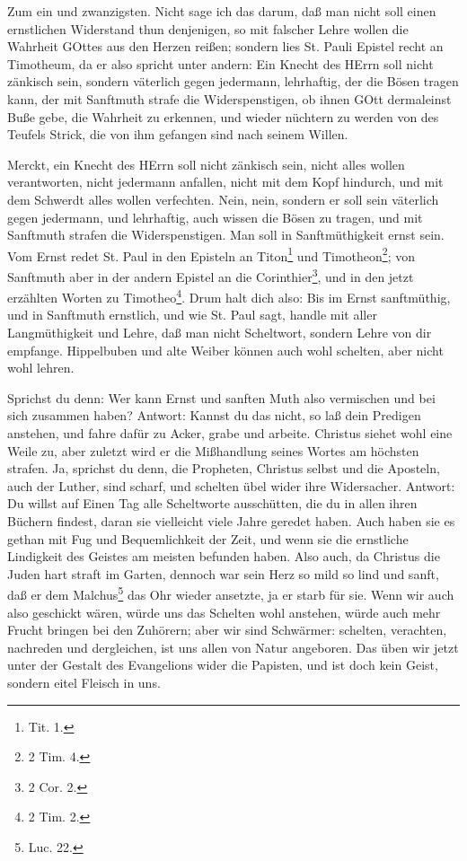 Zum ein und zwanzigsten. Nicht sage ich das darum, daß man nicht soll einen ernstlichen Widerstand thun denjenigen, so mit falscher Lehre wollen die Wahrheit GOttes aus den Herzen reißen; sondern lies St. Pauli Epistel recht an Timotheum, da er also spricht unter andern: Ein Knecht des HErrn soll nicht zänkisch sein, sondern väterlich gegen jedermann, lehrhaftig, der die Bösen tragen kann, der mit Sanftmuth strafe die Widerspenstigen, ob ihnen GOtt dermaleinst Buße gebe, die Wahrheit zu erkennen, und wieder nüchtern zu werden von des Teufels Strick, die von ihm gefangen sind nach seinem Willen.

Merckt, ein Knecht des HErrn soll nicht zänkisch sein, nicht alles wollen verantworten, nicht jedermann anfallen, nicht mit dem Kopf hindurch, und mit dem Schwerdt alles wollen verfechten. Nein, nein, sondern er soll sein väterlich gegen jedermann, und lehrhaftig, auch wissen die Bösen zu tragen, und mit Sanftmuth strafen die Widerspenstigen. Man soll in Sanftmüthigkeit
ernst sein. Vom Ernst redet St. Paul in den Episteln an Titon\footnote{Tit. 1.} und Timotheon\footnote{2 Tim. 4.}; von Sanftmuth aber in der andern Epistel an die Corinthier\footnote{2 Cor. 2.}, und in den jetzt erzählten Worten zu Timotheo\footnote{2 Tim. 2.}. Drum halt dich also: Bis im Ernst sanftmüthig, und in Sanftmuth ernstlich, und wie St. Paul sagt, handle mit aller Langmüthigkeit und Lehre, daß man nicht Scheltwort, sondern Lehre von dir empfange. Hippelbuben und alte Weiber können auch wohl schelten, aber nicht wohl lehren.

Sprichst du denn: Wer kann Ernst und sanften Muth also vermischen und bei sich zusammen haben? Antwort: Kannst du das nicht, so laß dein Predigen anstehen, und fahre dafür zu Acker, grabe und arbeite. Christus siehet wohl eine Weile zu, aber zuletzt wird er die Mißhandlung seines Wortes am höchsten strafen. Ja, sprichst du denn, die Propheten, Christus selbst und die Aposteln, auch der Luther, sind scharf, und schelten übel wider ihre Widersacher. Antwort: Du willst auf Einen Tag alle Scheltworte ausschütten, die du in allen ihren Büchern findest, daran sie vielleicht viele Jahre geredet haben. Auch haben sie es gethan mit Fug und Bequemlichkeit der Zeit, und wenn sie die ernstliche Lindigkeit des Geistes am meisten befunden haben. Also auch, da Christus die Juden hart straft im Garten, dennoch war sein Herz so mild so lind und sanft, daß er dem Malchus\footnote{Luc. 22.} das Ohr wieder ansetzte, ja er starb für sie. Wenn wir auch also geschickt wären, würde uns das Schelten wohl anstehen, würde auch mehr Frucht bringen bei den Zuhörern; aber wir sind Schwärmer: schelten, verachten, nachreden und dergleichen, ist uns allen von Natur angeboren. Das üben wir jetzt unter der
Gestalt des Evangelions wider die Papisten, und ist doch kein Geist, sondern eitel Fleisch in uns.

